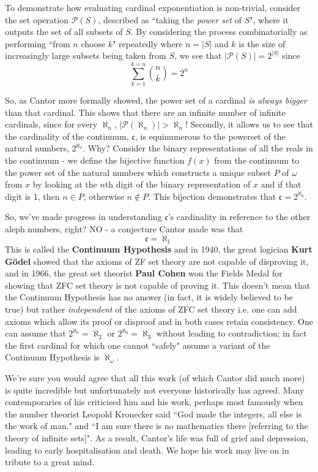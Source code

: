 To demonstrate how evaluating cardinal exponentiation is non-trivial, consider the set operation \(\mathcal{P}(S)\), described as ``taking the \textit{power set} of \(S\)", where it outputs the set of all subsets of \(S\). By considering the process combinatorially as performing ``from \(n\) choose \(k\)" repeatedly where \(n = |S|\) and \(k\) is the size of increasingly large subsets being taken from \(S\), we see that \( |\mathcal{P}(S)| = 2^{|S|}\) since \[ \sum^{k = n}_{k = 1} \binom{n}{k} = 2^n \]

So, as Cantor more formally showed, the power set of a cardinal \textit{is always bigger} than that cardinal. This shows that there are an infinite number of infinite cardinals, since for every \(\aleph_n\), \(|\mathcal{P} (\aleph_n)| > \aleph_n\)! Secondly, it allows us to see that the cardinality of the continuum, \(\mathfrak{c}\), is equinumerous to the powerset of the natural numbers, \(2^{\aleph_0}\). Why? Consider the binary representations of all the reals in the continuum - we define the bijective function \(f(x)\) from the continuum to the power set of the natural numbers which constructs a unique subset \(P\) of \(\omega\) from \(x\) by looking at the \(n\)th digit of the binary representation of \(x\) and if that digit is 1, then \(n \in P\), otherwise \(n \notin P\). This bijection demonstrates that \(\mathfrak{c} = 2^{\aleph_0}\).

So, we've made progress in understanding \(\mathfrak{c}\)'s cardinality in reference to the other aleph numbers, right? NO - a conjecture Cantor made was that \[ \mathfrak{c} = \aleph_1 \] This is called the \textbf{Continuum Hypothesis} and in 1940, the great logician \textbf{Kurt G\"odel} showed that the axioms of ZF set theory are not capable of disproving it, and in 1966, the great set theorist \textbf{Paul Cohen} won the Fields Medal for showing that ZFC set theory is not capable of proving it. This doesn't mean that the Continuum Hypothesis has no answer (in fact, it is widely believed to be true) but rather \textit{independent} of the axioms of ZFC set theory i.e. one can add axioms which allow its proof or disproof and in both cases retain consistency. One can assume that \(2^{\aleph_0} = \aleph_2\) or  \(2^{\aleph_0} = \aleph_3\) without leading to contradiction; in fact the first cardinal for which one cannot ``safely" assume a variant of the Continuum Hypothesis is \(\aleph_{\omega}\).

We're sure you would agree that all this work (of which Cantor did much more) is quite incredible but unfortunately not everyone historically has agreed. Many contemporaries of his criticised him and his work, perhaps most famously when the number theorist Leopold Kronecker said ``God made the integers, all else is the work of man." and ``I am sure there is no mathematics there [referring to the theory of infinite sets]". As a result, Cantor's life was full of grief and depression, leading to early hospitalisation and death. We hope his work may live on in tribute to a great mind.

